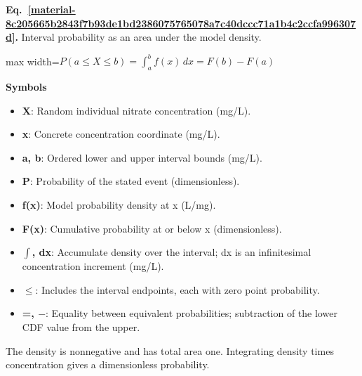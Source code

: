 \documentclass[11pt,a4paper]{article}
\begin{document}
\par\medskip
\noindent\begin{minipage}{\linewidth}
\label{material-8c205665b2843f7b93de1bd2386075765078a7c40dccc71a1b4c2ccfa996307d}
\noindent\textbf{Eq.~\ref*{material-8c205665b2843f7b93de1bd2386075765078a7c40dccc71a1b4c2ccfa996307d}.} Interval probability as an area under the model density.\par\nopagebreak
\begin{center}\begin{adjustbox}{max width=\linewidth}$\displaystyle P(a\le X\le b)=\int_a^b f(x)\,dx=F(b)-F(a)$\end{adjustbox}\end{center}

\par\noindent\textbf{Symbols}

\begin{itemize}\setlength{\itemsep}{1pt}\setlength{\parsep}{0pt}
\item \textbf{X}: Random individual nitrate concentration (mg/L).
\item \textbf{x}: Concrete concentration coordinate (mg/L).
\item \textbf{a, b}: Ordered lower and upper interval bounds (mg/L).
\item \textbf{P}: Probability of the stated event (dimensionless).
\item \textbf{f(x)}: Model probability density at x (L/mg).
\item \textbf{F(x)}: Cumulative probability at or below x (dimensionless).
\item \textbf{\ensuremath{\int}, dx}: Accumulate density over the interval; dx is an infinitesimal concentration increment (mg/L).
\item \textbf{\ensuremath{\le}}: Includes the interval endpoints, each with zero point probability.
\item \textbf{=, \ensuremath{-}}: Equality between equivalent probabilities; subtraction of the lower CDF value from the upper.
\end{itemize}

The density is nonnegative and has total area one. Integrating density times concentration gives a dimensionless probability.

\end{minipage}\par
\medskip
\end{document}

